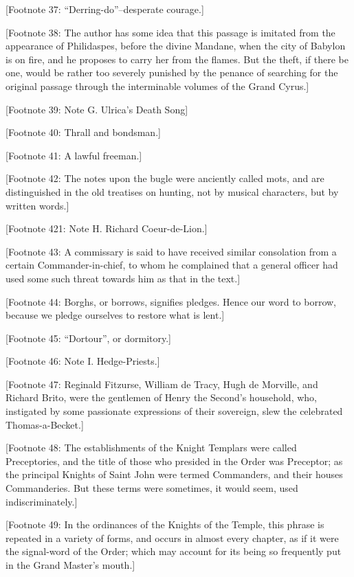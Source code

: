{[}Footnote 37: ``Derring-do''--desperate courage.{]}

{[}Footnote 38: The author has some idea that this passage is imitated
from the appearance of Philidaspes, before the divine Mandane, when the
city of Babylon is on fire, and he proposes to carry her from the
flames. But the theft, if there be one, would be rather too severely
punished by the penance of searching for the original passage through
the interminable volumes of the Grand Cyrus.{]}

{[}Footnote 39: Note G. Ulrica's Death Song{]}

{[}Footnote 40: Thrall and bondsman.{]}

{[}Footnote 41: A lawful freeman.{]}

{[}Footnote 42: The notes upon the bugle were anciently called mots, and
are distinguished in the old treatises on hunting, not by musical
characters, but by written words.{]}

{[}Footnote 421: Note H. Richard Coeur-de-Lion.{]}

{[}Footnote 43: A commissary is said to have received similar
consolation from a certain Commander-in-chief, to whom he complained
that a general officer had used some such threat towards him as that in
the text.{]}

{[}Footnote 44: Borghs, or borrows, signifies pledges. Hence our word to
borrow, because we pledge ourselves to restore what is lent.{]}

{[}Footnote 45: ``Dortour'', or dormitory.{]}

{[}Footnote 46: Note I. Hedge-Priests.{]}

{[}Footnote 47: Reginald Fitzurse, William de Tracy, Hugh de Morville,
and Richard Brito, were the gentlemen of Henry the Second's household,
who, instigated by some passionate expressions of their sovereign, slew
the celebrated Thomas-a-Becket.{]}

{[}Footnote 48: The establishments of the Knight Templars were called
Preceptories, and the title of those who presided in the Order was
Preceptor; as the principal Knights of Saint John were termed
Commanders, and their houses Commanderies. But these terms were
sometimes, it would seem, used indiscriminately.{]}

{[}Footnote 49: In the ordinances of the Knights of the Temple, this
phrase is repeated in a variety of forms, and occurs in almost every
chapter, as if it were the signal-word of the Order; which may account
for its being so frequently put in the Grand Master's mouth.{]}

